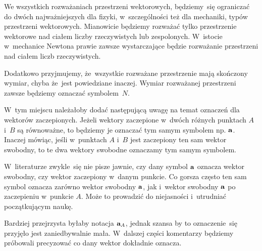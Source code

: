 \documentclass[a4paper,11pt]{article}
\numberwithin{equation}{section}
\begin{document}










\newpage


\vspace{0em}



\vspace{0em}


We wszystkich rozważaniach przestrzeni wektorowych, będziemy~się ograniczać
do dwóch najważniejszych dla fizyki, w~szczególności też dla mechaniki,
typów przestrzeni wektorowych. Mianowicie będziemy rozważać tylko
przestrzenie wektorowe nad ciałem liczby rzeczywistych lub zespolonych.
W~istocie w~mechanice Newtona prawie zawsze wystarczające będzie rozważanie
przestrzeni nad ciałem liczb rzeczywistych.

Dodatkowo przyjmujemy, że~wszystkie rozważane przestrzenie mają skończony
wymiar, chyba że~jest powiedziane inaczej. Wymiar rozważanej przestrzeni
zawsze będziemy oznaczać symbolem~$N$.

\vspace{\spaceFour}







\noindent
{} W~tym miejscu należałoby dodać następującą uwagę na temat oznaczeń
dla wektorów zaczepionych. Jeżeli wektory zaczepione w~dwóch różnych
punktach $A$ i~$B$ są równoważne, to będziemy je oznaczać tym samym symbolem
np. $\mathbf{a}$. Inaczej mówiąc, jeśli w~punktach $A$ i~$B$ jest zaczepiony
ten sam wektor swobodny, to te dwa wektory swobodne oznaczamy tym samym
symbolem.

W~literaturze zwykle~się nie pisze jawnie, czy dany symbol $\mathbf{a}$
oznacza wektor swobodny, czy wektor zaczepiony w~danym punkcie. Co gorsza
często ten sam symbol oznacza zarówno wektor swobodny $\mathbf{a}$, jak
i~wektor swobodny $\mathbf{a}$ po zaczepieniu w~punkcie $A$. Może to
prowadzić do niejasności i~utrudniać początkującym naukę.

Bardziej przejrzysta byłaby notacja $\mathbf{a}_{ A }$, jednak szansa by to
oznaczenie~się przyjęło jest zaniedbywalnie mała. W~dalszej części
komentarzy będziemy próbowali precyzować co dany wektor dokładnie oznacza.
\end{document}
